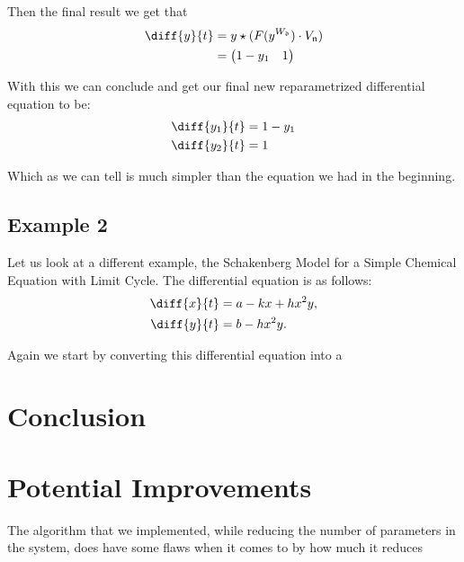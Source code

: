 \documentclass[oneside, a4paper, onecolumn, 11pt]{article}
\begin{document}
Then the final result we get that
\begin{align*}
    \diff{y}{t}
    & = y \star (F(y^{W_{\mathfrak{d}}}) \cdot V_{\mathfrak{n}}) \\
    & = \begin{pmatrix} 1 - y_1 & 1 \end{pmatrix}
\end{align*}

With this we can conclude and get our final new reparametrized differential equation to be:
\begin{align*}
    \diff{y_1}{t} & = 1 - y_1 \\
    \diff{y_2}{t} & = 1
\end{align*}

Which as we can tell is much simpler than the equation we had in the beginning.

\subsection{Example 2}

Let us look at a different example, the Schakenberg Model for a Simple Chemical Equation with Limit Cycle. The differential equation is as follows:
\begin{align*}
    \diff{x}{t} & = a - kx + hx^2 y, \\
    \diff{y}{t} & = b - hx^2 y.
\end{align*}

Again we start by converting this differential equation into a



\section{Conclusion}

\section{Potential Improvements}

The algorithm that we implemented, while reducing the number of parameters in the system, does have some flaws when it comes to by how much it reduces

\newpage




\end{document}
